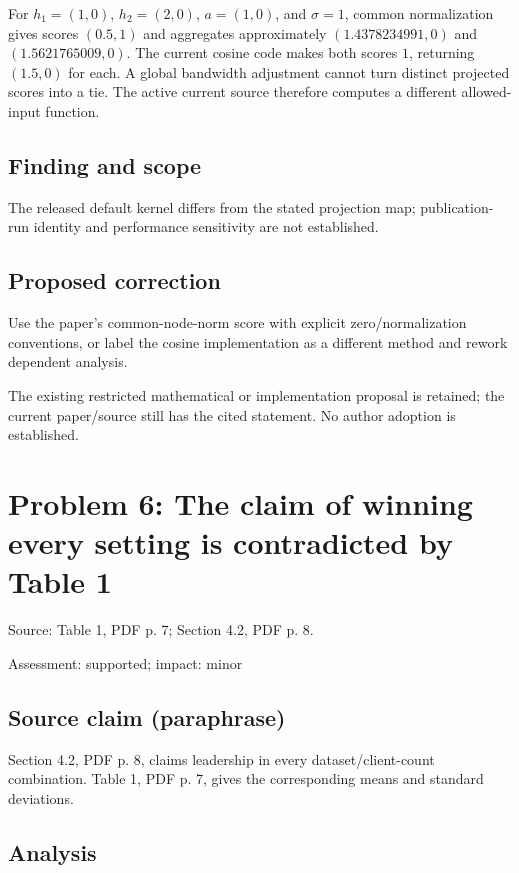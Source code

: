 \documentclass[11pt]{article}
\begin{document}
For \(h_1=(1,0)\), \(h_2=(2,0)\), \(a=(1,0)\), and \(\sigma=1\), common normalization gives scores \((0.5,1)\) and aggregates approximately \((1.4378234991,0)\) and \((1.5621765009,0)\). The current cosine code makes both scores \(1\), returning \((1.5,0)\) for each. A global bandwidth adjustment cannot turn distinct projected scores into a tie. The active current source therefore computes a different allowed-input function.

\subsection*{Finding and scope}

The released default kernel differs from the stated projection map; publication-run identity and performance sensitivity are not established.

\subsection*{Proposed correction}

Use the paper’s common-node-norm score with explicit zero/normalization conventions, or label the cosine implementation as a different method and rework dependent analysis.

The existing restricted mathematical or implementation proposal is retained; the current paper/source still has the cited statement. No author adoption is established.

\section*{Problem 6: The claim of winning every setting is contradicted by Table 1}

Source: Table 1, PDF p. 7; Section 4.2, PDF p. 8.

Assessment: supported; impact: minor

\subsection*{Source claim (paraphrase)}

Section 4.2, PDF p. 8, claims leadership in every dataset/client-count combination. Table 1, PDF p. 7, gives the corresponding means and standard deviations.

\subsection*{Analysis}
\end{document}
